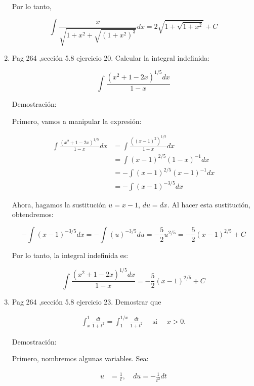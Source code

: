 \documentclass{report}
\begin{document}
\begin{enumerate}
        Por lo tanto,
        
        $$\int \frac{x}{\sqrt{1+x^{2}+\sqrt{\left(1+x^{2}\right)^{3}}}} d x = 2\sqrt{1+\sqrt{1+x^{2}}} + C$$
        
        \item Pag 264 ,sección 5.8 ejercicio 20. Calcular la integral indefinida:
        
        \[
        \int \frac{\left(x^{2}+1-2 x\right)^{1 / 5} d x}{1-x}
        \]
        
        
        Demostración:
        
        Primero, vamos a manipular la expresión:
        
        \begin{align*}
        \int{\frac{\left(x^2+1-2x\right)^{1/5}}{1-x}dx} &= \int{\frac{\left(\left(x-1\right)^2\right)^{1/5}}{1-x}dx} \\
        &= \int{\left(x-1\right)^{2/5}\left(1-x\right)^{-1}dx} \\
        &= -\int{\left(x-1\right)^{2/5}\left(x-1\right)^{-1}dx} \\
        &= -\int{\left(x-1\right)^{-3/5}dx}
        \end{align*}
        
        Ahora, hagamos la sustitución \( u=x-1 \), \( du=dx \). Al hacer esta sustitución, obtendremos:
        
        \[
        -\int{\left(x-1\right)^{-3/5}dx} = -\int{\left(u\right)^{-3/5}du} = -\frac{5}{2}u^{2/5} = -\frac{5}{2}\left(x-1\right)^{2/5} + C
        \]
        
        Por lo tanto, la integral indefinida es:
        
        \[
        \int \frac{\left(x^{2}+1-2 x\right)^{1 / 5} d x}{1-x} = -\frac{5}{2}\left(x-1\right)^{2/5} + C
        \]
        
        \item Pag 264 ,sección 5.8 ejercicio 23. Demostrar que
        
        \begin{align*}
        \int_{x}^{1} \frac{d t}{1+t^{2}}=\int_{1}^{1 / x} \frac{d t}{1+t^{2}} \quad \text { si } \quad x>0 .
        \end{align*}
        
        Demostración:
        
        Primero, nombremos algunas variables. Sea:
        
        \begin{align*}
        u &= \frac{1}{t}, \quad du = -\frac{1}{t^2}dt
        \end{align*}
        

\end{enumerate}
\end{document}
